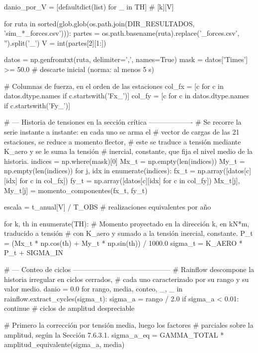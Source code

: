 \begin{pycode}
danio_por_V = [defaultdict(list) for _ in TH]      # [k][V]

for ruta in sorted(glob.glob(os.path.join(DIR_RESULTADOS, 'sim_*_forces.csv'))):
    partes = os.path.basename(ruta).replace('_forces.csv', '').split('_')
    V = int(partes[2][1:])

    datos = np.genfromtxt(ruta, delimiter=',', names=True)
    mask  = datos['Times'] >= 50.0          # descarte inicial (norma: al menos 5 s)

    # Columnas de fuerza, en el orden de las estaciones
    col_fx = [c for c in datos.dtype.names if c.startswith('Fx_')]
    col_fy = [c for c in datos.dtype.names if c.startswith('Fy_')]

    # --- Historia de tensiones en la sección crítica -------------------
    # Se recorre la serie instante a instante: en cada uno se arma el
    # vector de cargas de las 21 estaciones, se reduce a momento flector,
    # este se traduce a tensión mediante K_aero y se le suma la tensión
    # inercial, constante, que fija el nivel medio de la historia.
    indices = np.where(mask)[0]
    Mx_t = np.empty(len(indices))
    My_t = np.empty(len(indices))
    for j, idx in enumerate(indices):
        fx_t = np.array([datos[c][idx] for c in col_fx])
        fy_t = np.array([datos[c][idx] for c in col_fy])
        Mx_t[j], My_t[j] = momento_componentes(fx_t, fy_t)

    escala = t_anual[V] / T_OBS      # realizaciones equivalentes por año

    for k, th in enumerate(TH):
        # Momento proyectado en la dirección k, en kN*m, traducido a tensión
        # con K_aero y sumado a la tensión inercial, constante.
        P_t = (Mx_t * np.cos(th) + My_t * np.sin(th)) / 1000.0
        sigma_t = K_AERO * P_t + SIGMA_IN

        # --- Conteo de ciclos ------------------------------------------
        # Rainflow descompone la historia irregular en ciclos cerrados,
        # cada uno caracterizado por su rango y su valor medio.
        danio = 0.0
        for rango, media, conteo, _, _ in rainflow.extract_cycles(sigma_t):
            sigma_a = rango / 2.0
            if sigma_a < 0.01:
                continue             # ciclos de amplitud despreciable

            # Primero la corrección por tensión media, luego los factores
            # parciales sobre la amplitud, según la Sección 7.6.3.1.
            sigma_a_eq = GAMMA_TOTAL * amplitud_equivalente(sigma_a, media)


\end{pycode}
